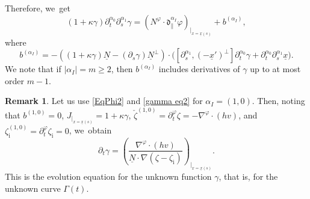 \documentclass[JEP,XML,SOM,Unicode,NoFloatCountersInSection,published]{cedram}
\newcommand{\dpar}{{\mathfrak d}_{\parallel}}
\newcommand{\dt}{\partial_t}
\newcommand{\ul}[1]{\underline{#1}}
\newcommand{\itGamma}{\mathit{\Gamma}}
\theoremstyle{definition}
\newtheorem{remark}[theorem]{Remark}
\begin{document}
Therefore, we~get
\begin{equation}\label{gamma eq2}
(1+\kappa\gamma)\dt^{\alpha_0}\partial_s^{\alpha_1}\gamma
=(N^\varphi\cdot\dpar^{\alpha_I}\varphi)_{\vert_{x=\ul{x}(s)}} + b^{(\alpha_I)},
\end{equation}
where
\[
b^{(\alpha_I)} = -((1+\kappa\gamma)\ul{N} - (\partial_s\gamma)\ul{N}^\perp)\cdot
\bigl([\partial_s^{\alpha_1},(-\ul{x}')^\perp]\dt^{\alpha_0}\gamma + \dt^{\alpha_0}\partial_s^{\alpha_1}\ul{x} \bigr).
\]
We note that if $|\alpha_I|=m\geq2$, then $b^{(\alpha_I)}$ includes derivatives of $\gamma$ up to at most order $m-1$.

\begin{remark}\label{re:EEg}
Let us use \eqref{EqPhi2} and \eqref{gamma eq2} for $\alpha_I\!=\!(1,0)$.
Then, noting that $b^{(1,0)}\!=\!0$, $J_{\vert_{x=\ul{x}(s)}}=1+\kappa\gamma$, $\check{\zeta}^{(1,0)}=\dt^\varphi\zeta=-\nabla^\varphi\cdot(hv)$, and
$\zeta_\mathrm{i}^{(1,0)}=\dt^\varphi\zeta_\mathrm{i}=0$, we~obtain
\[
\dt\gamma = \left(\frac{\nabla^\varphi\cdot(hv)}{\ul{N}\cdot\nabla(\zeta-\zeta_\mathrm{i})} \right)_{\vert_{x=\ul{x}(s)}}.
\]
This is the evolution equation for the unknown function $\gamma$, that is, for the unknown curve $\itGamma(t)$.
\end{remark}
\end{document}
